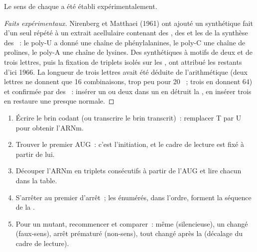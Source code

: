 \begin{proposition}\label{prop:g11:gene-expression:readcode}
Le sens de chaque  a été établi expérimentalement.
\end{proposition}
\begin{proof}[Faits expérimentaux]
Nirenberg et Matthaei (1961) ont ajouté un  synthétique fait d'un
seul  répété à un extrait acellulaire contenant des
, des  et les  de la synthèse des
~: le poly-U a donné une chaîne de phénylalanines, le poly-C
une chaîne de prolines, le poly-A une chaîne de lysines. Des 
synthétiques à motifs de deux et de trois lettres, puis la fixation de
triplets isolés sur les , ont attribué les  restants
d'ici 1966. La longueur de trois lettres avait été déduite de
l'arithmétique (deux lettres ne donnent que 16 combinaisons, trop peu
pour 20 ~; trois en donnent 64) et confirmée par des
~: insérer un ou deux  dans un  en détruit la
, en insérer trois en restaure une presque normale.
\end{proof}

\begin{method}\label{met:g11:gene-expression:translate}
\begin{enumerate}
  \item Écrire le brin codant (ou transcrire le brin transcrit)~:
        remplacer T par U pour obtenir l'ARNm.
  \item Trouver le premier AUG~: c'est l'initiation, et le cadre de
        lecture est fixé à partir de lui.
  \item Découper l'ARNm en triplets consécutifs à partir de l'AUG et
        lire chacun dans la table.
  \item S'arrêter au premier  d'arrêt~; les 
        énumérés, dans l'ordre, forment la séquence de la .
  \item Pour un mutant, recommencer et comparer~: même 
        (silencieuse), un  changé (faux-sens), arrêt
        prématuré (non-sens), tout changé après la  (décalage
        du cadre de lecture).
\end{enumerate}
\end{method}

